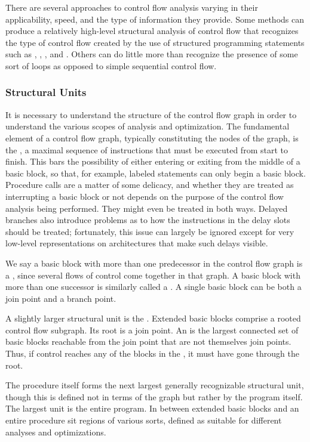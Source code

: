 There are several approaches to control flow analysis varying in their applicability, speed, and the type of information they provide. Some methods can produce a relatively high-level structural analysis of control flow that recognizes the type of control flow created by the use of structured programming statements such as , , , and . Others can do little more than recognize the presence of some sort of loops as opposed to simple sequential control flow.

\subsubsection{Structural Units}
It is necessary to understand the structure of the control flow graph in order to understand the various scopes of analysis and optimization. The fundamental element of a control flow graph, typically constituting the nodes of the graph, is the , a maximal sequence of instructions that must be executed from start to finish. This bars the possibility of either entering or exiting from the middle of a basic block, so that, for example, labeled statements can only begin a basic block. Procedure calls are a matter of some delicacy, and whether they are treated as interrupting a basic block or not depends on the purpose of the control flow analysis being performed. They might even be treated in both ways. Delayed branches also introduce problems as to how the instructions in the delay slots should be treated; fortunately, this issue can largely be ignored except for very low-level representations on architectures that make such delays visible.

We say a basic block with more than one predecessor in the control flow graph is a , since several flows of control come together in that graph. A basic block with more than one successor is similarly called a . A single basic block can be both a join point and a branch point.

A slightly larger structural unit is the . Extended basic blocks comprise a rooted control flow subgraph. Its root is a join point. An  is the largest connected set of basic blocks reachable from the join point that are not themselves join points. Thus, if control reaches any of the blocks in the , it must have gone through the root.

The procedure itself forms the next largest generally recognizable structural unit, though this is defined not in terms of the graph but rather by the program itself. The largest unit is the entire program. In between extended basic blocks and an entire procedure sit regions of various sorts, defined as suitable for different analyses and optimizations.

